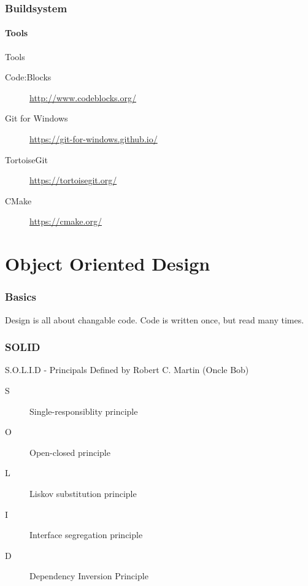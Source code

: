 \documentclass{beamer}
\begin{document}
\section{Buildsystem}
\subsection{Tools}
\begin{frame}{Tools}
\begin{description}
  \item[Code:Blocks] \url{http://www.codeblocks.org/}
  \item[Git for Windows] \url{https://git-for-windows.github.io/}
  \item[TortoiseGit] \url{https://tortoisegit.org/}
  \item[CMake] \url{https://cmake.org/}  
\end{description}
\end{frame}


\part{Object Oriented Design}

\section{Basics}

\begin{frame}
Design is all about changable code.
Code is written once, but read many times.
\end{frame}


\section{SOLID}

\begin{frame}{S.O.L.I.D - Principals}
Defined by Robert C. Martin (Oncle Bob)

\begin{description}
\item [S] Single-responsiblity principle
\item [O] Open-closed principle
\item [L] Liskov substitution principle
\item [I] Interface segregation principle
\item [D] Dependency Inversion Principle
\end{description}
\end{frame}
\end{document}
